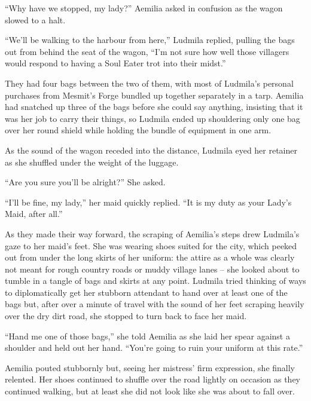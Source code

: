  

“Why have we stopped, my lady?” Aemilia asked in confusion as the wagon slowed to a halt.

 

“We’ll be walking to the harbour from here,” Ludmila replied, pulling the bags out from behind the seat of the wagon, “I’m not sure how well those villagers would respond to having a Soul Eater trot into their midst.”

 

They had four bags between the two of them, with most of Ludmila’s personal purchases from Mesmit’s Forge bundled up together separately in a tarp. Aemilia had snatched up three of the bags before she could say anything, insisting that it was her job to carry their things, so Ludmila ended up shouldering only one bag over her round shield while holding the bundle of equipment in one arm.

 

As the sound of the wagon receded into the distance, Ludmila eyed her retainer as she shuffled under the weight of the luggage.

 

“Are you sure you’ll be alright?” She asked.

 

“I’ll be fine, my lady,” her maid quickly replied. “It is my duty as your Lady’s Maid, after all.”

 

As they made their way forward, the scraping of Aemilia’s steps drew Ludmila’s gaze to her maid’s feet. She was wearing shoes suited for the city, which peeked out from under the long skirts of her uniform: the attire as a whole was clearly not meant for rough country roads or muddy village lanes – she looked about to tumble in a tangle of bags and skirts at any point. Ludmila tried thinking of ways to diplomatically get her stubborn attendant to hand over at least one of the bags but, after over a minute of travel with the sound of her feet scraping heavily over the dry dirt road, she stopped to turn back to face her maid.

 

“Hand me one of those bags,” she told Aemilia as she laid her spear against a shoulder and held out her hand. “You’re going to ruin your uniform at this rate.”

 

Aemilia pouted stubbornly but, seeing her mistress’ firm expression, she finally relented. Her shoes continued to shuffle over the road lightly on occasion as they continued walking, but at least she did not look like she was about to fall over.

